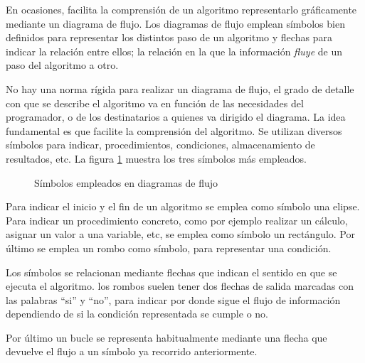 En ocasiones, facilita la comprensión de un algoritmo representarlo gráficamente mediante un diagrama de flujo. Los diagramas de flujo emplean símbolos bien definidos para representar los distintos paso de un algoritmo y flechas para indicar la relación entre ellos; la relación en la que la información \emph{fluye} de un paso del algoritmo a otro.

No hay una norma rígida para realizar un diagrama de flujo, el grado de detalle con que se describe el algoritmo va en función de las necesidades del programador, o de los destinatarios a quienes va dirigido el diagrama. La idea fundamental es que facilite la comprensión del algoritmo. Se utilizan diversos símbolos para indicar, procedimientos, condiciones, almacenamiento de resultados, etc. La figura \ref{fig:flujo} muestra los tres símbolos más empleados.

\begin{figure}[h]
\centering
{}
\caption{Símbolos empleados en diagramas de flujo}
\label{fig:flujo}
\end{figure}

Para indicar el inicio y el fin de un algoritmo se emplea como símbolo una elipse. Para indicar un procedimiento concreto, como por ejemplo realizar un cálculo, asignar un valor a una variable, etc, se emplea como símbolo un rectángulo. Por último se emplea un rombo como símbolo, para representar una condición.

Los símbolos se relacionan mediante flechas que indican el sentido en que se ejecuta el algoritmo. los rombos suelen tener dos flechas de salida marcadas con las palabras ``si'' y ``no'', para indicar por donde sigue el flujo de información dependiendo de si la condición representada se cumple o no.

Por último un bucle se representa habitualmente mediante una flecha que devuelve el flujo a un símbolo ya recorrido anteriormente. 

